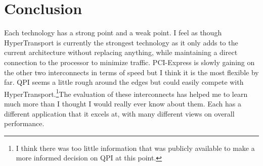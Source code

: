 \documentclass[conference]{IEEEtran}
\begin{document}
\section{Conclusion}

Each technology has a strong point and a weak point. I feel as though
HyperTransport is currently the strongest technology as it only adds to the
current architecture without replacing anything, while maintaining a direct
connection to the processor to minimize traffic. PCI-Express is slowly gaining
on the other two interconnects in terms of speed but I think it is the most
flexible by far. QPI seems a little rough around the edges but could easily
compete with HyperTransport.\footnote{I think there was too little information
that was publicly available to make a more informed decision on QPI at this
point.}The evaluation of these interconnects has helped me to learn much more
than I thought I would really ever know about them. Each has a different
application that it excels at, with many different views on overall
performance. 



\end{document}
